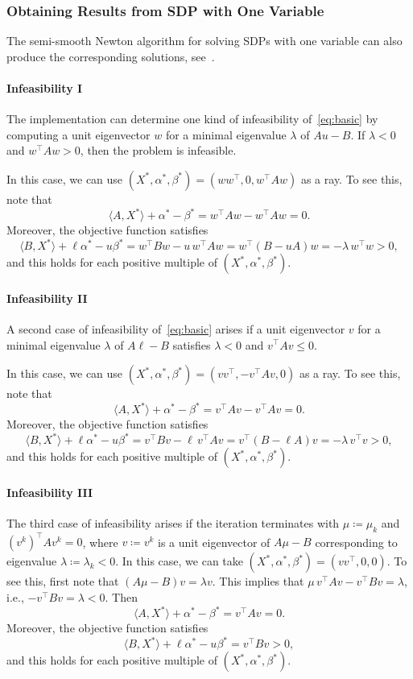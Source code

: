 \documentclass[10pt, a4paper]{article}
\newcommand{\define}{\coloneqq}
\newcommand{\skal}[2]{\langle{#1},{#2}\rangle}
\newcommand{\T}{^{\top}}
\begin{document}
\subsubsection{Obtaining Results from SDP with One Variable}

The semi-smooth Newton algorithm for solving SDPs with one variable can
also produce the corresponding solutions, see~\cite{MatP22}.

\paragraph{Infeasibility I}

The implementation can determine one kind of infeasibility
of~\eqref{eq:basic} by computing a unit eigenvector $w$ for a minimal
eigenvalue $\lambda$ of $A u - B$. If $\lambda < 0$ and $w\T A w > 0$, then
the problem is infeasible.

In this case, we can use $(X^*, \alpha^*, \beta^*) = (w w\T, 0, w\T A w)$
as a ray. To see this, note that
\[
\skal{A}{X^*} + \alpha^* - \beta^* = w\T A w - w\T A w = 0.
\]
Moreover, the objective function satisfies
\[
\skal{B}{X^*} + \ell \alpha^* - u \beta^* = w\T B w - u\, w\T A w = w\T (B -
u A) w = -\lambda\, w\T w > 0,
\]
and this holds for each positive multiple of $(X^*, \alpha^*, \beta^*)$.

\paragraph{Infeasibility II}

A second case of infeasibility of~\eqref{eq:basic} arises if a unit
eigenvector $v$ for a minimal eigenvalue $\lambda$ of $A \ell - B$
satisfies $\lambda < 0$ and $v\T A v \leq 0$.

In this case, we can use $(X^*, \alpha^*, \beta^*) = (v v\T, -v\T A v, 0)$
as a ray. To see this, note that
\[
\skal{A}{X^*} + \alpha^* - \beta^* = v\T A v - v\T A v = 0.
\]
Moreover, the objective function satisfies
\[
\skal{B}{X^*} + \ell \alpha^* - u \beta^* = v\T B v - \ell\, v\T A v = v\T (B -
\ell A) v = -\lambda\, v\T v > 0,
\]
and this holds for each positive multiple of $(X^*, \alpha^*, \beta^*)$.

\paragraph{Infeasibility III}

The third case of infeasibility arises if the iteration terminates with
$\mu \define \mu_k$ and $(v^k)\T A v^k = 0$, where $v \define v^k$ is a
unit eigenvector of $A \mu - B$ corresponding to eigenvalue
$\lambda \define \lambda_k < 0$. In this case, we can take
$(X^*, \alpha^*, \beta^*) = (v v\T, 0, 0)$. To see this, first note that
$(A \mu - B)v = \lambda v$. This implies that
$\mu\, v\T A v - v\T B v = \lambda$, i.e., $- v\T B v = \lambda < 0$. Then
\[
\skal{A}{X^*} + \alpha^* - \beta^* = v\T A v = 0.
\]
Moreover, the objective function satisfies
\[
\skal{B}{X^*} + \ell \alpha^* - u \beta^* = v\T B v > 0,
\]
and this holds for each positive multiple of $(X^*, \alpha^*, \beta^*)$.
\end{document}

